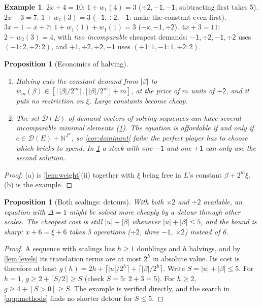 \documentclass[11pt,a4paper]{article}
\newtheorem{proposition}[theorem]{Proposition}
\theoremstyle{definition}
\newtheorem{example}[theorem]{Example}
\theoremstyle{remark}
\newcommand{\N}{\mathbb{N}}
\newcommand{\mX}{\ensuremath{\mathord{-}\mathsf{x}}}
\newcommand{\pU}{\ensuremath{\mathord{+}\mathsf{1}}}
\newcommand{\mU}{\ensuremath{\mathord{-}\mathsf{1}}}
\newcommand{\dbl}{\ensuremath{\mathord{\times}\mathsf{2}}}
\newcommand{\hlv}{\ensuremath{\mathord{\div}\mathsf{2}}}
\newcommand{\abs}[1]{\lvert #1\rvert}
\begin{document}
\begin{example}\label{ex:halve}
$2x+4=10$: $1+w_1(4)=3$ ($\hlv,\mU,\mU$; subtracting first takes 5).
$2x+3=7$: $1+w_1(3)=3$ ($\mU,\hlv,\mU$: make the constant even first).
$3x+1=x+7$: $1+w_1(1)+w_1(1)=3$ ($\mX,\mU,\hlv$).
$4x+3=11$: $2+w_2(3)=4$, with \emph{two incomparable} cheapest demands:
$\mU,\hlv,\mU,\hlv$ uses $(\mU{:}2,\hlv{:}2)$, and $\pU,\hlv,\hlv,\mU$ uses
$(\pU{:}1,\mU{:}1,\hlv{:}2)$.
\end{example}

\begin{proposition}[Economics of halving]\label{prop:halve-econ}
\leavevmode
\begin{enumerate}[label=(\alph*),nosep]
\item Halving cuts the constant demand from $\abs\beta$ to $w_m(\beta)\in
  [\lceil\abs\beta/2^m\rceil,\lfloor\abs\beta/2^m\rfloor+m]$, at the price of $m$
  units of $\hlv$, and it puts no restriction on $\xi$. Large constants become cheap.
\item The set $\mathcal D(E)$ of demand vectors of solving sequences can have several
  incomparable minimal elements (\cref{ex:halve}). The equation is affordable if and
  only if $c\in\mathcal D(E)+\N^{J''}$, so \cref{cor:dominant} fails: the perfect player
  has to \emph{choose} which bricks to spend. In \cref{ex:halve} a stock with one $\mU$
  and one $\pU$ can only use the second solution.
\end{enumerate}
\end{proposition}
\begin{proof}
(a) is \cref{lem:weight}(ii) together with $\xi$ being free in $L$'s constant
$\beta+2^m\xi$. (b) is the example.
\end{proof}

\begin{proposition}[Both scalings: detours]\label{prop:detour}
With both $\dbl$ and $\hlv$ available, an equation with $\Delta=1$ might be solved more
cheaply by a detour through other scales. The cheapest cost is still $\abs u+\abs\beta$
whenever $\abs u+\abs\beta\le5$, and the bound is sharp: $x+6=\xi+6$ takes 5 operations
($\hlv$, three $\mU$, $\dbl$) instead of 6.
\end{proposition}
\begin{proof}
A sequence with scalings has $h\ge1$ doublings and $h$ halvings, and by
\cref{lem:levels} its translation terms are at most $2^h$ in absolute value. Its cost is
therefore at least
$g(h)=2h+\lceil\abs u/2^h\rceil+\lceil\abs\beta/2^h\rceil$. Write
$S=\abs u+\abs\beta\le5$. For $h=1$,
$g\ge2+\lceil S/2\rceil\ge S$ (check $S=5$: $2+3=5$). For $h\ge2$,
$g\ge4+[S>0]\ge S$. The example is verified directly, and the search in
\cref{app:methods} finds no shorter detour for $S\le5$.
\end{proof}
\end{document}

